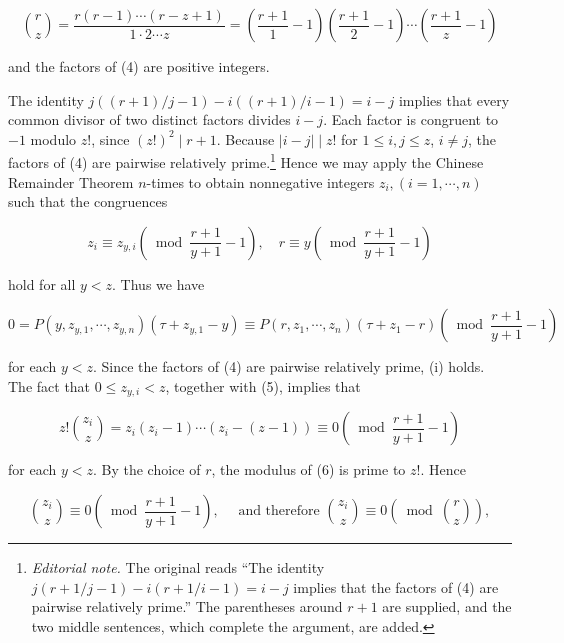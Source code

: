 \documentclass[11pt,a4paper]{article}
\newcommand{\origpage}[1]{\marginnote{\footnotesize\textbf{[#1]}}}
\newcommand{\ednote}[1]{\footnote{\textit{Editorial note.} #1}}
\begin{document}
\begin{equation*}
\binom{r}{z}=\frac{r(r-1) \cdots(r-z+1)}{1 \cdot 2 \cdots z}=\left(\frac{r+1}{1}-1\right)\left(\frac{r+1}{2}-1\right) \cdots\left(\frac{r+1}{z}-1\right) \tag{4}
\end{equation*}


and the factors of (4) are positive integers.

The identity $j((r+1)/j-1)-i((r+1)/i-1)=i-j$ implies that every common divisor of two distinct factors divides $i-j$. Each factor is congruent to $-1$ modulo $z!$, since $(z!)^2\mid r+1$. Because $|i-j|\mid z!$ for $1\leq i,j\leq z$, $i\ne j$, the factors of (4) are pairwise relatively prime.\ednote{The original reads ``The identity $j(r+1/j-1)-i(r+1/i-1)=i-j$ implies that the factors of (4) are pairwise relatively prime.'' The parentheses around $r+1$ are supplied, and the two middle sentences, which complete the argument, are added.} Hence we may apply the Chinese Remainder Theorem $n$-times to obtain nonnegative integers $z_{i},(i=1, \cdots, n)$ such that the congruences


\begin{equation*}
z_{i} \equiv z_{y, i}\left(\bmod \frac{r+1}{y+1}-1\right), \quad r \equiv y\left(\bmod \frac{r+1}{y+1}-1\right) \tag{5}
\end{equation*}


\origpage{342}hold for all $y<z$. Thus we have

$$
0=P\left(y, z_{y, 1}, \cdots, z_{y, n}\right)\left(\tau+z_{y, 1}-y\right) \equiv P\left(r, z_{1}, \cdots, z_{n}\right)\left(\tau+z_{1}-r\right)\left(\bmod \frac{r+1}{y+1}-1\right)
$$

for each $y<z$. Since the factors of (4) are pairwise relatively prime, (i) holds. The fact that $0 \leq z_{y, i}<z$, together with (5), implies that


\begin{equation*}
z!\binom{z_{i}}{z}=z_{i}\left(z_{i}-1\right) \cdots\left(z_{i}-(z-1)\right) \equiv 0\left(\bmod \frac{r+1}{y+1}-1\right) \tag{6}
\end{equation*}


for each $y<z$. By the choice of $r$, the modulus of (6) is prime to $z!$. Hence


\begin{equation*}
\binom{z_{i}}{z} \equiv 0\left(\bmod \frac{r+1}{y+1}-1\right), \quad \text { and therefore }\binom{z_{i}}{z} \equiv 0\left(\bmod \binom{r}{z}\right), \tag{7}
\end{equation*}
\end{document}
